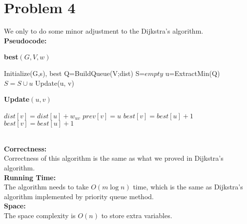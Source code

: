 \documentclass[twoside]{homework}
\begin{document}
\section*{Problem 4}
We only to do some minor adjustment to the Dijkstra's algorithm.
\\\textbf{Pseudocode:} \quad
\begin{algorithm}
	\caption*{\textbf{best$(G,V,w)$}}
	\begin{algorithmic}
		\STATE Initialize(G,s), best
		\STATE Q=BuildQueue({V;dist})
		\STATE S=$empty$
		\STATE u=ExtractMin(Q)
		\STATE $S=S\cup u$
		\STATE Update(u, v)
		\ENDFOR
		\ENDWHILE
	\end{algorithmic}		
\end{algorithm}
\begin{algorithm}
	\caption*{\textbf{Update$(u,v)$}}
	\begin{algorithmic}
		\STATE $dist[v]=dist[u]+w_{uv}$
		\STATE $prev[v]=u$
		\STATE $best[v]=best[u]+1$
		\ENDIF
		\STATE $best[v]=best[u]+1$
		\ENDIF
		\ENDIF
	\end{algorithmic}		
\end{algorithm}
\\\textbf{Correctness:} 
\\Correctness of this algorithm is the same as what we proved in Dijkstra's algorithm.  
\\\textbf{Running Time:} \quad
\\The algorithm needs to take $O(m\log n)$ time, which is the same as Dijkstra's algorithm implemented by priority queue method.
\\\textbf{Space:} \quad
\\The space complexity is $O(n)$ to store extra variables.
\end{document}
